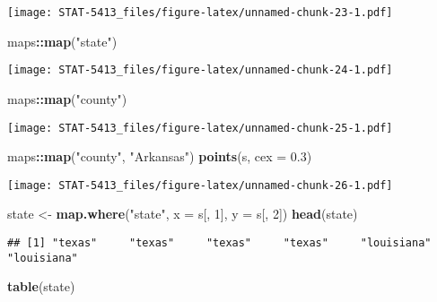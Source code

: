 \documentclass[]{book}
\newenvironment{Shaded}{\begin{snugshade}}{\end{snugshade}}
\newcommand{\DataTypeTok}[1]{\textcolor[rgb]{0.13,0.29,0.53}{#1}}
\newcommand{\DecValTok}[1]{\textcolor[rgb]{0.00,0.00,0.81}{#1}}
\newcommand{\FloatTok}[1]{\textcolor[rgb]{0.00,0.00,0.81}{#1}}
\newcommand{\KeywordTok}[1]{\textcolor[rgb]{0.13,0.29,0.53}{\textbf{#1}}}
\newcommand{\NormalTok}[1]{#1}
\newcommand{\OperatorTok}[1]{\textcolor[rgb]{0.81,0.36,0.00}{\textbf{#1}}}
\newcommand{\StringTok}[1]{\textcolor[rgb]{0.31,0.60,0.02}{#1}}
\begin{document}
\texttt{[image: STAT-5413\_files/figure-latex/unnamed-chunk-23-1.pdf]}

\begin{Shaded}
\begin{Highlighting}[]
\NormalTok{maps}\OperatorTok{::}\KeywordTok{map}\NormalTok{(}\StringTok{"state"}\NormalTok{)}
\end{Highlighting}
\end{Shaded}

\texttt{[image: STAT-5413\_files/figure-latex/unnamed-chunk-24-1.pdf]}

\begin{Shaded}
\begin{Highlighting}[]
\NormalTok{maps}\OperatorTok{::}\KeywordTok{map}\NormalTok{(}\StringTok{"county"}\NormalTok{)}
\end{Highlighting}
\end{Shaded}

\texttt{[image: STAT-5413\_files/figure-latex/unnamed-chunk-25-1.pdf]}

\begin{Shaded}
\begin{Highlighting}[]
\NormalTok{maps}\OperatorTok{::}\KeywordTok{map}\NormalTok{(}\StringTok{"county"}\NormalTok{, }\StringTok{"Arkansas"}\NormalTok{)}
\KeywordTok{points}\NormalTok{(s, }\DataTypeTok{cex =} \FloatTok{0.3}\NormalTok{)}
\end{Highlighting}
\end{Shaded}

\texttt{[image: STAT-5413\_files/figure-latex/unnamed-chunk-26-1.pdf]}

\begin{Shaded}
\begin{Highlighting}[]
\NormalTok{state <-}\StringTok{ }\KeywordTok{map.where}\NormalTok{(}\StringTok{"state"}\NormalTok{, }\DataTypeTok{x =}\NormalTok{ s[, }\DecValTok{1}\NormalTok{], }\DataTypeTok{y =}\NormalTok{ s[, }\DecValTok{2}\NormalTok{])}
\KeywordTok{head}\NormalTok{(state)}
\end{Highlighting}
\end{Shaded}

\begin{verbatim}
## [1] "texas"     "texas"     "texas"     "texas"     "louisiana" "louisiana"
\end{verbatim}

\begin{Shaded}
\begin{Highlighting}[]
\KeywordTok{table}\NormalTok{(state)}
\end{Highlighting}
\end{Shaded}
\end{document}
